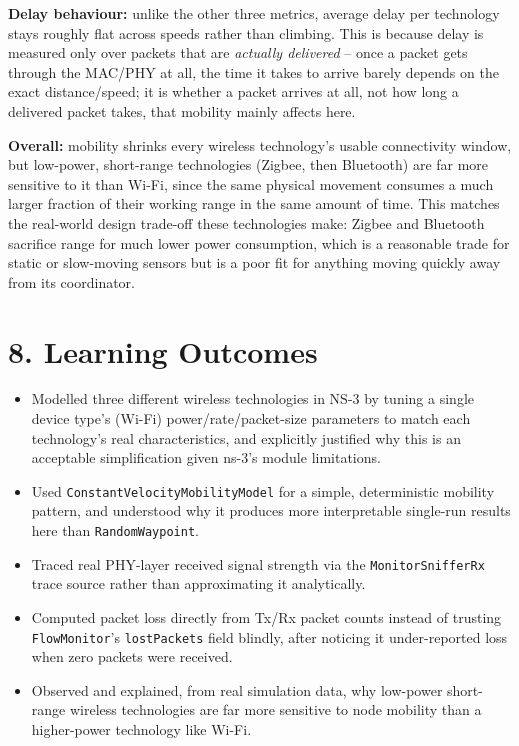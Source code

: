 \documentclass[11pt]{article}
\begin{document}
\textbf{Delay behaviour:} unlike the other three metrics, average delay per
technology stays roughly flat across speeds rather than climbing. This is
because delay is measured only over packets that are \emph{actually
delivered} -- once a packet gets through the MAC/PHY at all, the time it
takes to arrive barely depends on the exact distance/speed; it is whether a
packet arrives at all, not how long a delivered packet takes, that mobility
mainly affects here.

\textbf{Overall:} mobility shrinks every wireless technology's usable
connectivity window, but low-power, short-range technologies (Zigbee, then
Bluetooth) are far more sensitive to it than Wi-Fi, since the same physical
movement consumes a much larger fraction of their working range in the same
amount of time. This matches the real-world design trade-off these
technologies make: Zigbee and Bluetooth sacrifice range for much lower power
consumption, which is a reasonable trade for static or slow-moving sensors
but is a poor fit for anything moving quickly away from its coordinator.

\section*{8. Learning Outcomes}
\begin{itemize}
  \item Modelled three different wireless technologies in NS-3 by tuning a
        single device type's (Wi-Fi) power/rate/packet-size parameters to
        match each technology's real characteristics, and explicitly
        justified why this is an acceptable simplification given ns-3's
        module limitations.
  \item Used \texttt{ConstantVelocityMobilityModel} for a simple,
        deterministic mobility pattern, and understood why it produces more
        interpretable single-run results here than \texttt{RandomWaypoint}.
  \item Traced real PHY-layer received signal strength via the
        \texttt{MonitorSnifferRx} trace source rather than approximating it
        analytically.
  \item Computed packet loss directly from Tx/Rx packet counts instead of
        trusting \texttt{FlowMonitor}'s \texttt{lostPackets} field blindly,
        after noticing it under-reported loss when zero packets were
        received.
  \item Observed and explained, from real simulation data, why low-power
        short-range wireless technologies are far more sensitive to node
        mobility than a higher-power technology like Wi-Fi.
\end{itemize}
\end{document}
